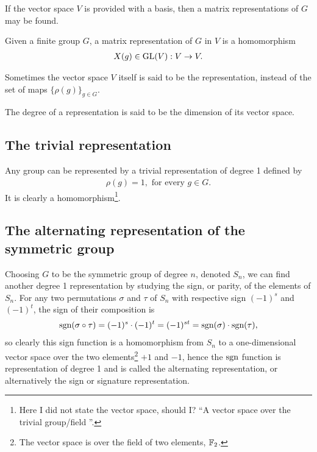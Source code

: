 	If the vector space $V$ is provided with a basis, then a matrix representations of $G$ may be found.
	\begin{definition}
		Given a finite group $G$, a matrix representation of $G$ in $V$ is a homomorphism
		\begin{align}
			X(g) \in \text{GL}(V): V \rightarrow V.
		\end{align}
	\end{definition}
	
	\begin{note}
		Sometimes the vector space $V$ itself is said to be the representation, instead of the set of maps $\{\rho(g)\}_{g \in G}$.
	\end{note}
	
	\begin{definition}
		The degree of a representation is said to be the dimension of its vector space.
	\end{definition}
	
	\subsection{The trivial representation}
	
	Any group can be represented by a trivial representation of degree 1 defined by 
	\begin{align}
		\rho(g) = 1, \text{ for every } g \in G.
	\end{align}
	It is clearly a homomorphism\footnote{Here I did not state the vector space, should I? ``A vector space over the trivial group/field	''.}. 
	
	\subsection{The alternating representation of the symmetric group}
	
	Choosing $G$ to be the symmetric group of degree $n$, denoted $S_n$, we can find another degree 1 representation by studying the sign, or parity, of the elements of $S_n$. For any two permutations $\sigma$ and $\tau$ of $S_n$ with respective sign $(-1)^s$ and $(-1)^t$, the sign of their composition is 
	\begin{align}
		\text{sgn}(\sigma \circ \tau) = (-1)^s \cdot (-1)^t = (-1)^{st} = \text{sgn}(\sigma) \cdot \text{sgn}(\tau),
	\end{align}
	so clearly this sign function is a homomorphism from $S_n$ to a one-dimensional vector space over the two elements\footnote{The vector space is over the field of two elements, $\mathbb{F}_2$.} $+1$ and $-1$, hence the $\text{sgn}$ function is representation of degree 1 and is called the alternating representation, or alternatively the sign or signature representation.
	
